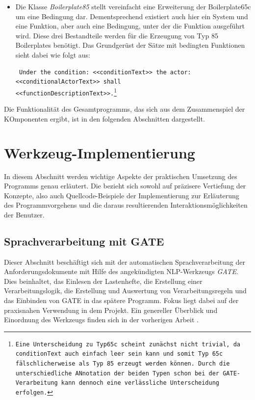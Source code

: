 \documentclass[12pt]{report}
\begin{document}
\begin{itemize}
\begin{itemize}
\tt
The complete system <<System>> shall perform \\
<<FunctionDescription>>.\footnote{<<System>> und <<FunctionDescription>> werden durch die Verarbeitung des Satzes in GATE eindeutig anhand passender Annotationen identifiziert und zugeordnet. Der Rest des Satzes ist fest hinterlegt.}
\rm

\item Die Klasse \textit{Boilerplate85} stellt vereinfacht eine Erweiterung der Boilerplate65c um eine Bedingung dar. Dementsprechend existiert auch hier ein System und eine Funktion, aber auch eine Bedingung, unter der die Funktion ausgeführt wird. Diese drei Bestandteile werden für die Erzeugung von Typ 85 Boilerplates benötigt. Das Grundgerüst der Sätze mit bedingten Funktionen sieht dabei wie folgt aus:

\tt
Under the condition: <<conditionText>> the actor: \\
<<conditionalActorText>> shall \\
<<functionDescriptionText>>.\footnote{Eine Unterscheidung zu Typ65c scheint zunächst nicht trivial, da conditionText auch einfach leer sein kann und somit Typ 65c fälschlicherweise als Typ 85 erzeugt werden können. Durch die unterschiedliche ANnotation der beiden Typen schon bei der GATE-Verarbeitung kann dennoch eine verlässliche Unterscheidung erfolgen.}
\rm
\end{itemize}

\end{itemize}
Die Funktionalität des Gesamtprogramms, das sich aus dem Zusammenspiel der KOmponenten ergibt, ist in den folgenden Abschnitten dargestellt.


\section{Werkzeug-Implementierung}
In diesem Abschnitt werden wichtige Aspekte der praktischen Umsetzung des Programms genau erläutert. Die bezieht sich sowohl auf präzisere Vertiefung der Konzepte, also auch Quellcode-Beispiele der Implementierung zur Erläuterung des Programmvorgehens und die daraus resultierenden Interaktionsmöglichkeiten der Benutzer.  
\subsection{Sprachverarbeitung mit GATE}
Dieser Abschnitt beschäftigt sich mit der automatischen Sprachverarbeitung der Anforderungsdokumente mit Hilfe des angekündigten NLP-Werkzeugs \textit{GATE}. Dies beinhaltet, das Einlesen der Lastenhefte, die Erstellung einer Verarbeitungslogik, die Erstellung und Auswertung von Verarbeitungsregeln und das Einbinden von GATE in das spätere Programm. Fokus liegt dabei auf der praxisnahen Verwendung in dem Projekt. Ein genereller Überblick und Einordnung des Werkzeugs finden sich in der vorherigen Arbeit \cite{rs18}.
\end{document}
